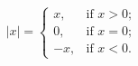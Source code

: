 \documentclass{article}
\begin{document}
\vspace*{\fill} \vspace*{-5ex}
$$
|x|=\begin{cases}
x,&\text{if $x>0$;}\\
0,&\text{if $x=0$;}\\
-x,&\text{if $x<0$.}
\end{cases}
$$

\vspace*{\fill}
\end{document}
